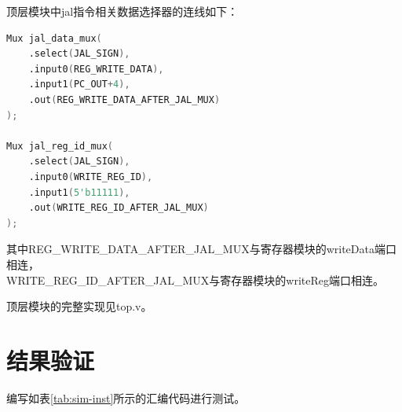 \documentclass[UTF8]{ctexart}
\begin{document}
顶层模块中jal指令相关数据选择器的连线如下：
\begin{lstlisting}[language=verilog]
Mux jal_data_mux(
    .select(JAL_SIGN),
    .input0(REG_WRITE_DATA),
    .input1(PC_OUT+4),
    .out(REG_WRITE_DATA_AFTER_JAL_MUX)
);

Mux jal_reg_id_mux(
    .select(JAL_SIGN),
    .input0(WRITE_REG_ID),
    .input1(5'b11111),
    .out(WRITE_REG_ID_AFTER_JAL_MUX)
);
\end{lstlisting}\par
其中REG\_WRITE\_DATA\_AFTER\_JAL\_MUX与寄存器模块的writeData端口相连，\\WRITE\_REG\_ID\_AFTER\_JAL\_MUX与寄存器模块的writeReg端口相连。\par
顶层模块的完整实现见top.v。

\section{结果验证}
编写如表\ref{tab:sim-inst}所示的汇编代码进行测试。\par
\end{document}
